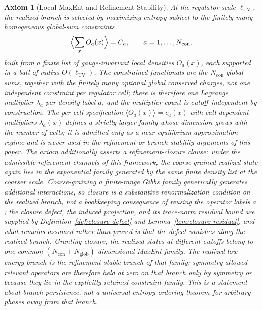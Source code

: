 \documentclass[11pt]{article}
\newtheorem{axiom}{Axiom}
\begin{document}
\begin{axiom}[Local MaxEnt and Refinement Stability]\label{ax:maxent}
At the regulator scale \(\ell_{\mathrm{UV}}\), the realized branch is selected by maximizing entropy subject to the finitely many homogeneous global-sum constraints
\[
\Bigl\langle\sum_x O_a(x)\Bigr\rangle=C_a,
\qquad a=1,\dots,N_{\mathrm{con}},
\]
built from a finite list of gauge-invariant local densities \(O_a(x)\), each supported in a ball of radius \(O(\ell_{\mathrm{UV}})\). The constrained functionals are the \(N_{\mathrm{con}}\) global sums, together with the finitely many optional global conserved charges, not one independent constraint per regulator cell; there is therefore one Lagrange multiplier \(\lambda_a\) per density label \(a\), and the multiplier count is cutoff-independent by construction. The per-cell specification \(\langle O_a(x)\rangle=c_a(x)\) with cell-dependent multipliers \(\lambda_a(x)\) defines a strictly larger family whose dimension grows with the number of cells; it is admitted only as a near-equilibrium approximation regime and is never used in the refinement or branch-stability arguments of this paper. The axiom additionally asserts a \emph{refinement-closure clause}: under the admissible refinement channels of this framework, the coarse-grained realized state again lies in the exponential family generated by the same finite density list at the coarser scale. Coarse-graining a finite-range Gibbs family generically generates additional interactions, so closure is a substantive renormalization condition on the realized branch, not a bookkeeping consequence of reusing the operator labels \(a\); the closure defect, the induced projection, and its trace-norm residual bound are supplied by Definition~\ref{def:closure-defect} and Lemma~\ref{lem:closure-residual}, and what remains assumed rather than proved is that the defect vanishes along the realized branch. Granting closure, the realized states at different cutoffs belong to one common \((N_{\mathrm{con}}+N_{\mathrm{glob}})\)-dimensional MaxEnt family. The realized low-energy branch is the refinement-stable branch of that family; symmetry-allowed relevant operators are therefore held at zero on that branch only by symmetry or because they lie in the explicitly retained constraint family. This is a statement about branch persistence, not a universal entropy-ordering theorem for arbitrary phases away from that branch.
\end{axiom}
\end{document}
